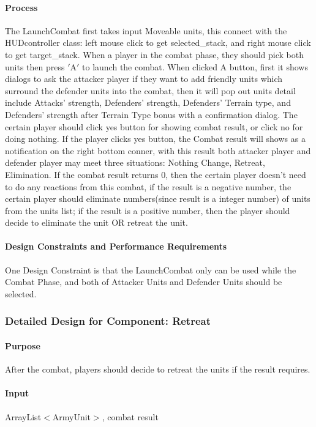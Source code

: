 \documentclass[12pt,a4paper,titlepage]{article}
\begin{document}
\paragraph{Process} The LaunchCombat first takes input Moveable units, this connect with the HUDcontroller class: left mouse click to get selected\_stack, and right mouse click to get target\_stack. When a player in the combat phase, they should pick both units then press $'$A$'$ to launch the combat. When clicked A button, first it shows dialogs to ask the attacker player if they want to add friendly units which surround the defender units into the combat, then it will pop out units detail include Attacks' strength, Defenders' strength, Defenders' Terrain type, and Defenders' strength after Terrain Type bonus with a confirmation dialog. The certain player should click yes button for showing combat result, or click no for doing nothing. If the player clicks yes button, the Combat result will shows as a notification on the right bottom conner, with this result both attacker player and defender player may meet three situations: Nothing Change, Retreat, Elimination. If the combat result returns 0, then the certain player doesn't need to do any reactions from this combat, if the result is a negative number, the certain player should eliminate numbers(since result is a integer number) of units from the units list; if the result is a positive number, then the player should decide to eliminate the unit OR retreat the unit.
\paragraph{Design Constraints and Performance Requirements} 
One Design Constraint is that the LaunchCombat only can be used while the Combat Phase, and both of Attacker Units and Defender Units should be selected. 

\subsubsection{Detailed Design for Component: Retreat}
\paragraph{Purpose} After the combat, players should decide to retreat the units if the result requires.
\paragraph{Input} ArrayList$<$ArmyUnit$>$, combat result
\end{document}
